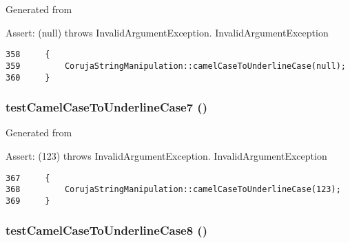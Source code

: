 Generated from \begin{Desc}
\item[Assert:](null) throws InvalidArgumentException.  InvalidArgumentException \end{Desc}


\begin{Code}\begin{verbatim}358     {
359         CorujaStringManipulation::camelCaseToUnderlineCase(null);
360     }
\end{verbatim}
\end{Code}


\hypertarget{class_coruja_string_manipulation_test_adcd219254d8ac6b440f06411bcfb3c9}{
\subsubsection[{testCamelCaseToUnderlineCase7}]{\setlength{\rightskip}{0pt plus 5cm}testCamelCaseToUnderlineCase7 ()}}
\label{class_coruja_string_manipulation_test_adcd219254d8ac6b440f06411bcfb3c9}


Generated from \begin{Desc}
\item[Assert:](123) throws InvalidArgumentException.  InvalidArgumentException \end{Desc}


\begin{Code}\begin{verbatim}367     {
368         CorujaStringManipulation::camelCaseToUnderlineCase(123);
369     }
\end{verbatim}
\end{Code}


\hypertarget{class_coruja_string_manipulation_test_bea69f550b604aa6e0e59393a80f73f7}{
\subsubsection[{testCamelCaseToUnderlineCase8}]{\setlength{\rightskip}{0pt plus 5cm}testCamelCaseToUnderlineCase8 ()}}
\label{class_coruja_string_manipulation_test_bea69f550b604aa6e0e59393a80f73f7}


